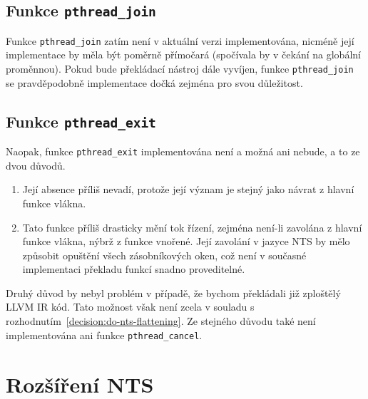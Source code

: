 \documentclass[12pt]{fithesis2}
\begin{document}
\subsection{Funkce \texttt{pthread\_join}}
Funkce \texttt{pthread\_join} zatím není v aktuální verzi implementována, nicméně její implementace by měla být poměrně přímočará (spočívala by v čekání na globální proměnnou). Pokud bude překládací nástroj dále vyvíjen, funkce \texttt{pthread\_join} se pravděpodobně implementace dočká zejména pro svou důležitost.

\subsection{Funkce \texttt{pthread\_exit}}
Naopak, funkce \texttt{pthread\_exit} implementována není a možná ani nebude, a to ze dvou důvodů.
\begin{enumerate}
\item Její absence příliš nevadí, protože její význam je stejný jako návrat z hlavní funkce vlákna.
\item Tato funkce příliš drasticky mění tok řízení, zejména není-li zavolána z hlavní funkce vlákna, nýbrž z funkce vnořené. Její zavolání v jazyce NTS by mělo způsobit opuštění všech zásobníkových oken, což není v současné implementaci překladu funkcí snadno proveditelné.
\end{enumerate}
Druhý důvod by nebyl problém v případě, že bychom překládali již zploštělý LLVM IR kód. Tato možnost však není zcela v souladu s rozhodnutím~\ref{decision:do-nts-flattening}. Ze stejného důvodu také není implementována ani funkce \texttt{pthread\_cancel}.


\section{Rozšíření NTS}
\label{sec:nts-extensions}
\end{document}
